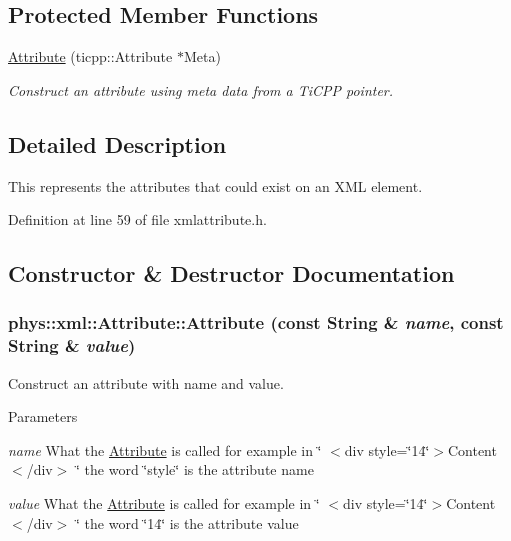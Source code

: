 \subsection*{Protected Member Functions}
\begin{DoxyCompactItemize}
\item 
\hypertarget{classphys_1_1xml_1_1Attribute_aeea008baed4c687e9ed9e1f3563f0c01}{
\hyperlink{classphys_1_1xml_1_1Attribute_aeea008baed4c687e9ed9e1f3563f0c01}{Attribute} (ticpp::Attribute $\ast$Meta)}
\label{da/ddf/classphys_1_1xml_1_1Attribute_aeea008baed4c687e9ed9e1f3563f0c01}

\begin{DoxyCompactList}\small\item\em Construct an attribute using meta data from a TiCPP pointer. \item\end{DoxyCompactList}\end{DoxyCompactItemize}


\subsection{Detailed Description}
This represents the attributes that could exist on an XML element. 

Definition at line 59 of file xmlattribute.h.



\subsection{Constructor \& Destructor Documentation}
\hypertarget{classphys_1_1xml_1_1Attribute_abce6652f3a2ca2cf5a5d46b7ceb1e108}{
\subsubsection[{Attribute}]{\setlength{\rightskip}{0pt plus 5cm}phys::xml::Attribute::Attribute (const {\bf String} \& {\em name}, \/  const {\bf String} \& {\em value})}}
\label{da/ddf/classphys_1_1xml_1_1Attribute_abce6652f3a2ca2cf5a5d46b7ceb1e108}


Construct an attribute with name and value. 


\begin{DoxyParams}{Parameters}
\item[{\em name}]What the \hyperlink{classphys_1_1xml_1_1Attribute}{Attribute} is called for example in \char`\"{} $<$div style=\char`\"{}14\char`\"{}$>$Content$<$/div$>$ \char`\"{} the word \char`\"{}style\char`\"{} is the attribute name \item[{\em value}]What the \hyperlink{classphys_1_1xml_1_1Attribute}{Attribute} is called for example in \char`\"{} $<$div style=\char`\"{}14\char`\"{}$>$Content$<$/div$>$ \char`\"{} the word \char`\"{}14\char`\"{} is the attribute value \end{DoxyParams}


